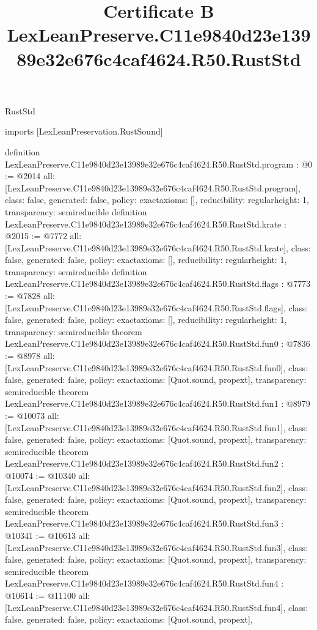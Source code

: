 \begin{lexlean}{RustStd}
\title{Certificate B LexLeanPreserve.C11e9840d23e13989e32e676c4caf4624.R50.RustStd}
\begin{coremodule}
imports [LexLeanPreservation.RustSound]

definition LexLeanPreserve.C11e9840d23e13989e32e676c4caf4624.R50.RustStd.program : @0 := @2014 {
  all: [LexLeanPreserve.C11e9840d23e13989e32e676c4caf4624.R50.RustStd.program],
  class: false,
  generated: false,
  policy: exact{axioms: []},
  reducibility: regular{height: 1},
  transparency: semireducible
}
definition LexLeanPreserve.C11e9840d23e13989e32e676c4caf4624.R50.RustStd.krate : @2015 := @7772 {
  all: [LexLeanPreserve.C11e9840d23e13989e32e676c4caf4624.R50.RustStd.krate],
  class: false,
  generated: false,
  policy: exact{axioms: []},
  reducibility: regular{height: 1},
  transparency: semireducible
}
definition LexLeanPreserve.C11e9840d23e13989e32e676c4caf4624.R50.RustStd.flags : @7773 := @7828 {
  all: [LexLeanPreserve.C11e9840d23e13989e32e676c4caf4624.R50.RustStd.flags],
  class: false,
  generated: false,
  policy: exact{axioms: []},
  reducibility: regular{height: 1},
  transparency: semireducible
}
theorem LexLeanPreserve.C11e9840d23e13989e32e676c4caf4624.R50.RustStd.fun0 : @7836 := @8978 {
  all: [LexLeanPreserve.C11e9840d23e13989e32e676c4caf4624.R50.RustStd.fun0],
  class: false,
  generated: false,
  policy: exact{axioms: [Quot.sound, propext]},
  transparency: semireducible
}
theorem LexLeanPreserve.C11e9840d23e13989e32e676c4caf4624.R50.RustStd.fun1 : @8979 := @10073 {
  all: [LexLeanPreserve.C11e9840d23e13989e32e676c4caf4624.R50.RustStd.fun1],
  class: false,
  generated: false,
  policy: exact{axioms: [Quot.sound, propext]},
  transparency: semireducible
}
theorem LexLeanPreserve.C11e9840d23e13989e32e676c4caf4624.R50.RustStd.fun2 : @10074 := @10340 {
  all: [LexLeanPreserve.C11e9840d23e13989e32e676c4caf4624.R50.RustStd.fun2],
  class: false,
  generated: false,
  policy: exact{axioms: [Quot.sound, propext]},
  transparency: semireducible
}
theorem LexLeanPreserve.C11e9840d23e13989e32e676c4caf4624.R50.RustStd.fun3 : @10341 := @10613 {
  all: [LexLeanPreserve.C11e9840d23e13989e32e676c4caf4624.R50.RustStd.fun3],
  class: false,
  generated: false,
  policy: exact{axioms: [Quot.sound, propext]},
  transparency: semireducible
}
theorem LexLeanPreserve.C11e9840d23e13989e32e676c4caf4624.R50.RustStd.fun4 : @10614 := @11100 {
  all: [LexLeanPreserve.C11e9840d23e13989e32e676c4caf4624.R50.RustStd.fun4],
  class: false,
  generated: false,
  policy: exact{axioms: [Quot.sound, propext]},
}
\end{coremodule}
\end{lexlean}
